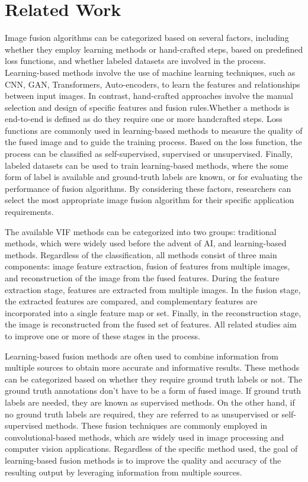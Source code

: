 \chapter{Related Work}
\label{chp:RelatedWork}

Image fusion algorithms can be categorized based on several factors, including whether they employ learning methods or hand-crafted steps, based on predefined loss functions, and whether labeled datasets are involved in the process. Learning-based methods involve the use of machine learning techniques, such as CNN, GAN, Transformers, Auto-encoders, to learn the features and relationships between input images. In contrast, hand-crafted approaches involve the manual selection and design of specific features and fusion rules.Whether a methods is end-to-end is defined as do they require one or more handcrafted steps. Loss functions are commonly used in learning-based methods to measure the quality of the fused image and to guide the training process. Based on the loss function, the process can be classified as self-supervised, supervised or unsupervised. Finally, labeled datasets can be used to train learning-based methods, where the some form of label is available and ground-truth labels are known, or for evaluating the performance of fusion algorithms. By considering these factors, researchers can select the most appropriate image fusion algorithm for their specific application requirements.

The available VIF methods can be categorized into two groups: traditional methods, which were widely used before the advent of AI, and learning-based methods. Regardless of the classification, all methods consist of three main components: image feature extraction, fusion of features from multiple images, and reconstruction of the image from the fused features. During the feature extraction stage, features are extracted from multiple images. In the fusion stage, the extracted features are compared, and complementary features are incorporated into a single feature map or set. Finally, in the reconstruction stage, the image is reconstructed from the fused set of features. All related studies aim to improve one or more of these stages in the process.

Learning-based fusion methods are often used to combine information from multiple sources to obtain more accurate and informative results. These methods can be categorized based on whether they require ground truth labels or not. The ground truth annotations don't have to be a form of fused image. If ground truth labels are needed, they are known as supervised methods. On the other hand, if no ground truth labels are required, they are referred to as unsupervised or self-supervised methods. These fusion techniques are commonly employed in convolutional-based methods, which are widely used in image processing and computer vision applications. Regardless of the specific method used, the goal of learning-based fusion methods is to improve the quality and accuracy of the resulting output by leveraging information from multiple sources.

